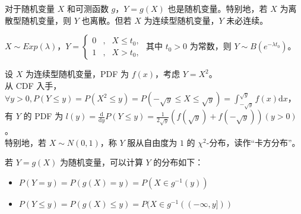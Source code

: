 \documentclass[../main.tex]{subfiles}
\begin{document}
对于随机变量 $X$ 和可测函数 $g$，$Y=g(X)$ 也是随机变量。特别地，若 $X$ 为离散型随机变量，则 $Y$ 也离散。但若 $X$ 为连续型随机变量，$Y$ 未必连续。

\begin{example}
    $X\sim Exp(\lambda)$，$Y=\left\{
        \begin{aligned}
            0 & , & X\leq t_0, \\
            1 & , & X>t_0,
        \end{aligned}
        \right.$ 其中 $t_0>0$ 为常数，则 $Y\sim B(e^{-\lambda t_0})$。
\end{example}

\begin{example}
    设 $X$ 为连续型随机变量，PDF 为 $f(x)$，考虑 $Y=X^2$。\\
    从 CDF 入手，$\forall y>0,P(Y\leq y)=P(X^2\leq y)=P(-\sqrt{y}\leq X\leq \sqrt{y})=\int_{-\sqrt{y}}^{\sqrt{y}}f(x)\mathrm{d}x$，有 $Y$ 的 PDF 为 $l(y)=\frac{\mathrm{d}}{\mathrm{d}y}P(Y\leq y)=\frac{1}{2\sqrt{y}}(f(\sqrt{y})+f(-\sqrt{y}))(y>0)$。\\
    特别地，若 $X\sim N(0,1)$，称 $Y$ 服从自由度为 $1$ 的 $\chi^2$-分布，读作“卡方分布”。
\end{example}

若 $Y=g(X)$ 为随机变量，可以计算 $Y$ 的分布如下：
\begin{itemize}
    \item $P(Y=y)=P(g(X)=y)=P(X\in g^{-1}(y))$
    \item $P(Y\leq y)=P(g(X)\leq y)=P(X\in g^{-1}((-\infty,y]))$
\end{itemize}
\end{document}
